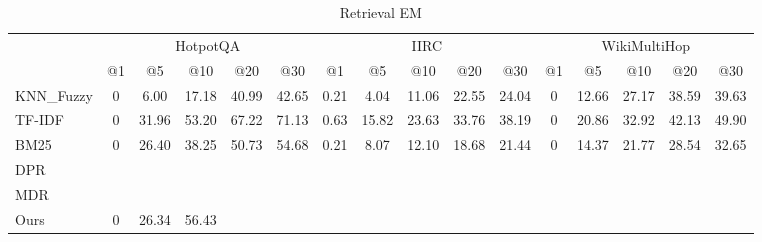 \begin{table}[]
\scriptsize
\centering
\begin{tabular}{lccccc|ccccc|ccccc}
\hline
\multirow{2}{*}{} & \multicolumn{5}{c|}{HotpotQA} & \multicolumn{5}{c|}{IIRC} & \multicolumn{5}{c}{WikiMultiHop} \\
 & @1 & @5 & @10 & @20 & @30 & @1 & @5 & @10 & @20 & @30 & @1 & @5 & @10 & @20 & @30 \\
\hline
KNN\_Fuzzy & 0 & 6.00 & 17.18 & 40.99 & 42.65 & 0.21 & 4.04 & 11.06 & 22.55 & 24.04 & 0 & 12.66 & 27.17 & 38.59 & 39.63 \\
TF-IDF & 0 & 31.96 & 53.20 & 67.22 & 71.13 & 0.63 & 15.82 & 23.63 & 33.76 & 38.19 & 0 & 20.86 & 32.92 & 42.13 & 49.90 \\
BM25 & 0 & 26.40 & 38.25 & 50.73 & 54.68 & 0.21 & 8.07 & 12.10 & 18.68 & 21.44 & 0 & 14.37 & 21.77 & 28.54 & 32.65 \\
DPR &  &  &  &  &  &  &  &  &  &  &  &  &  &  &  \\
MDR &  &  &  &  &  &  &  &  &  &  &  &  &  &  &  \\
Ours & 0 & 26.34 & 56.43 &  &  &  &  &  &  &  &  &  &  &  &  \\
\hline
\end{tabular}
\caption{Retrieval EM}
\end{table}






